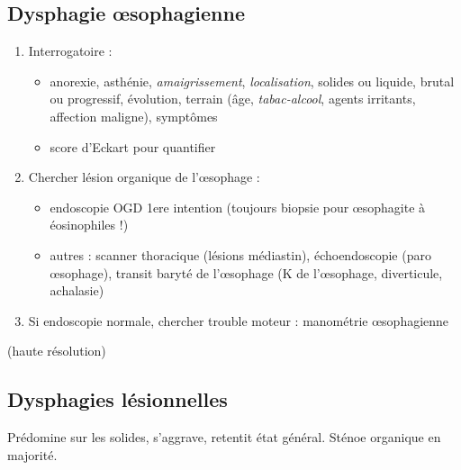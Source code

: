 \documentclass[11pt]{article}
\begin{document}
\subsection{Dysphagie \oe{}sophagienne}
\label{sec:org6a2e44b}
\begin{enumerate}
\item Interrogatoire : 
\begin{itemize}
\item anorexie, asthénie, \emph{amaigrissement}, \emph{localisation}, solides
ou liquide, brutal ou progressif, évolution, terrain (âge, \emph{tabac-alcool},
agents irritants, affection maligne), symptômes
\item score d'Eckart pour quantifier
\end{itemize}
\item Chercher lésion organique de l'\oe{}sophage :
\begin{itemize}
\item endoscopie OGD 1ere intention (toujours biopsie pour \oe{}sophagite à
éosinophiles !)
\item autres : scanner thoracique (lésions médiastin), échoendoscopie (paro
\oe{}sophage), transit baryté de l'\oe{}sophage (K de l'\oe{}sophage,
diverticule, achalasie)
\end{itemize}
\item Si endoscopie normale, chercher trouble moteur : manométrie \oe{}sophagienne
\end{enumerate}
(haute résolution)

\subsection{Dysphagies lésionnelles}
\label{sec:org8e61c67}
Prédomine sur les solides, s'aggrave, retentit état général. Sténoe organique en
majorité.
\end{document}
